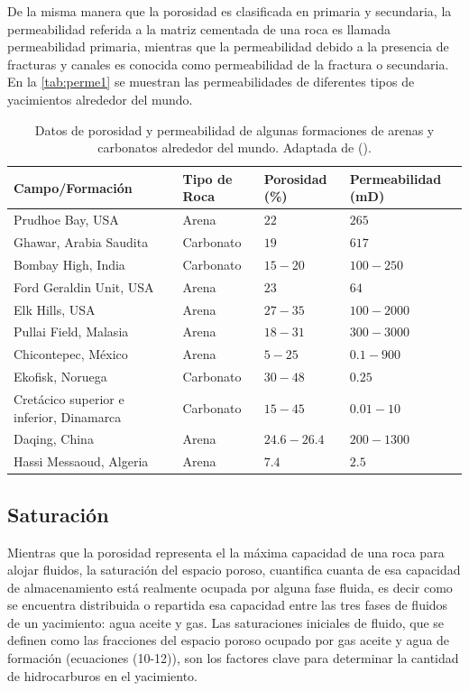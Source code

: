 De la misma manera que la porosidad es clasificada en primaria y secundaria, la permeabilidad referida a la matriz cementada de una roca es llamada permeabilidad primaria, mientras que la permeabilidad debido a la presencia de fracturas y canales es conocida como permeabilidad de la fractura o secundaria. En la \autoref{tab:perme1} se muestran las permeabilidades de diferentes tipos de yacimientos alrededor del mundo.

\begin{table}
    \caption[Permebalidades de yacimientos]{Datos de porosidad y permeabilidad de algunas formaciones de arenas y carbonatos alrededor del mundo. Adaptada de (\cite{Dandekar}).}
    \centering \footnotesize
    \begin{tabulary}{\textwidth \tymin=47pt }{L L L L}
        \toprule 
        Campo/Formación & Tipo de Roca &  Porosidad (\%) & Permeabilidad (mD)\\ 
        \midrule              
        Prudhoe Bay, USA & Arena & $22$ & $265$ \\
        Ghawar, Arabia Saudita & Carbonato & $19$ & $617$\\
        Bombay High, India & Carbonato & $15-20$ & $100-250$\\
        Ford Geraldin Unit, USA & Arena  & $23$ & $64$\\
        Elk Hills, USA & Arena & $27-35$ & $100-2000$\\
        Pullai Field, Malasia & Arena & $18-31$ & $300-3000$\\
        Chicontepec, México & Arena & $5-25$ & $0.1-900$\\
        Ekofisk, Noruega & Carbonato  & $30-48$  & $0.25$ \\
        Cretácico superior e inferior, Dinamarca & Carbonato & $15-45$ & $0.01-10$\\
        Daqing, China & Arena & $24.6-26.4$ & $200-1300$\\
        Hassi Messaoud, Algeria & Arena & $7.4$ & $2.5$ \\
        \midrule
        \bottomrule
    \end{tabulary}
    \label{tab:perme1}
\end{table}


\subsection{Saturación}
Mientras que la porosidad representa el la máxima capacidad de una roca para alojar fluidos, la saturación del espacio poroso, cuantifica cuanta de esa capacidad de almacenamiento está realmente ocupada por alguna fase fluida, es decir como se encuentra distribuida o repartida esa capacidad entre las tres fases de fluidos de un yacimiento: agua aceite y gas. Las saturaciones iniciales de fluido, que se definen como las fracciones del espacio poroso ocupado por gas aceite y agua de formación (ecuaciones (10-12)), son los factores clave para determinar la cantidad de hidrocarburos en el yacimiento.
 

